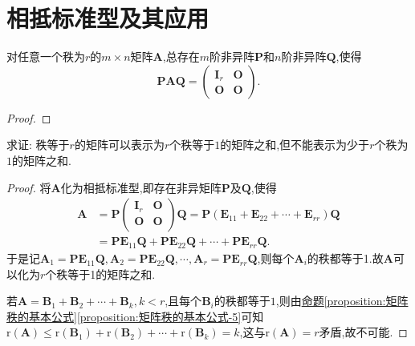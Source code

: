 \documentclass[../../main.tex]{subfiles}%
\begin{document}
\section{相抵标准型及其应用}

\begin{theorem}[矩阵的相抵标准型]\label{theorem:矩阵的相抵标准型}
对任意一个秩为\(r\)的\(m\times n\)矩阵\(\boldsymbol{A}\),总存在\(m\)阶非异阵\(\boldsymbol{P}\)和\(n\)阶非异阵\(\boldsymbol{Q}\),使得
\[
\boldsymbol{P}\boldsymbol{A}\boldsymbol{Q}=\begin{pmatrix}
\boldsymbol{I}_r&\boldsymbol{O}\\
\boldsymbol{O}&\boldsymbol{O}
\end{pmatrix}.
\]
\end{theorem}
\begin{proof}

\end{proof}

\begin{proposition}[矩阵的秩1分解]\label{proposition:矩阵的秩1分解}
求证: 秩等于\(r\)的矩阵可以表示为\(r\)个秩等于\(1\)的矩阵之和,但不能表示为少于\(r\)个秩为\(1\)的矩阵之和.
\end{proposition}
\begin{proof}
将\(\boldsymbol{A}\)化为相抵标准型,即存在非异矩阵\(\boldsymbol{P}\)及\(\boldsymbol{Q}\),使得
\begin{align*}
\boldsymbol{A}&=\boldsymbol{P}\left( \begin{matrix}
\boldsymbol{I}_r&		\boldsymbol{O}\\
\boldsymbol{O}&		\boldsymbol{O}\\
\end{matrix} \right) \boldsymbol{Q}=\boldsymbol{P}\left( \boldsymbol{E}_{11}+\boldsymbol{E}_{22}+\cdots +\boldsymbol{E}_{rr} \right) \boldsymbol{Q}
\\
&=\boldsymbol{PE}_{11}\boldsymbol{Q}+\boldsymbol{PE}_{22}\boldsymbol{Q}+\cdots +\boldsymbol{PE}_{rr}\boldsymbol{Q}.
\end{align*}
于是记$\boldsymbol{A}_1=\boldsymbol{PE}_{11}\boldsymbol{Q},\boldsymbol{A}_2=\boldsymbol{PE}_{22}\boldsymbol{Q},\cdots ,\boldsymbol{A}_r=\boldsymbol{PE}_{rr}\boldsymbol{Q}$,则每个$\boldsymbol{A}_i$的秩都等于1.故$\boldsymbol{A}$可以化为$r$个秩等于1的矩阵之和.

若\(\boldsymbol{A}=\boldsymbol{B}_1+\boldsymbol{B}_2+\cdots+\boldsymbol{B}_k,k < r\),且每个\(\boldsymbol{B}_i\)的秩都等于\(1\),则由\hyperref[proposition:矩阵秩的基本公式-5]{命题\ref{proposition:矩阵秩的基本公式}\ref{proposition:矩阵秩的基本公式-5}}可知\(\mathrm{r}(\boldsymbol{A})\leqslant \mathrm{r}(\boldsymbol{B}_1)+\mathrm{r}(\boldsymbol{B}_2)+\cdots+\mathrm{r}(\boldsymbol{B}_k)=k\),这与\(\mathrm{r}(\boldsymbol{A}) = r\)矛盾,故不可能.
\end{proof}
\end{document}
